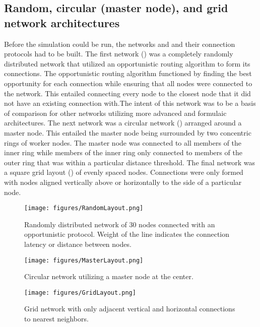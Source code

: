 \documentclass[twocolumn,10pt]{IEEEtran}
\begin{document}
\subsection{Random, circular (master node), and grid network architectures}
Before the simulation could be run, the networks and and their connection protocols had to be built. The first network () was a completely randomly distributed network that utilized an opportunistic routing algorithm to form its connections. The opportunistic routing algorithm functioned by finding the best opportunity for each connection while ensuring that all nodes were connected to the network. This entailed connecting every node to the closest node that it did not have an existing connection with.The intent of this network was to be a basis of comparison for other networks utilizing more advanced and formulaic architectures. The next network was a circular network () arranged around a master node. This entailed the master node being surrounded by two concentric rings of worker nodes. The master node was connected to all members of the inner ring while members of the inner ring only connected to members of the outer ring that was within a particular distance threshold. The final network was a square grid layout () of evenly spaced nodes. Connections were only formed with nodes aligned vertically above or horizontally to the side of a particular node. 
\begin{figure}
\begin{center}
\texttt{[image: figures/RandomLayout.png]}
\end{center}
\caption{Randomly distributed network of 30 nodes connected with an opportunistic protocol. Weight of the line indicates the connection latency or distance between nodes.}
\label{fig:randomnetwork}
\end{figure}
\begin{figure}
\begin{center}
\texttt{[image: figures/MasterLayout.png]}
\end{center}
\caption{Circular network utilizing a master node at the center.}
\label{fig:circularnetwork}
\end{figure}
\begin{figure}
\begin{center}
\texttt{[image: figures/GridLayout.png]}
\end{center}
\caption{Grid network with only adjacent vertical and horizontal connections to nearest neighbors.}
\label{fig:gridnetwork}
\end{figure}
\end{document}
